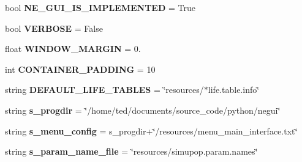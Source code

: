 \begin{DoxyCompactItemize}
\item 
bool {\bfseries N\+E\+\_\+\+G\+U\+I\+\_\+\+I\+S\+\_\+\+I\+M\+P\+L\+E\+M\+E\+N\+T\+ED} = True\hypertarget{namespacenegui_1_1pghostnotebook_a713e3c49323a10efdf84414a10af9f9e}{}\label{namespacenegui_1_1pghostnotebook_a713e3c49323a10efdf84414a10af9f9e}

\item 
bool {\bfseries V\+E\+R\+B\+O\+SE} = False\hypertarget{namespacenegui_1_1pghostnotebook_a047e31164346351c4093c0192244c081}{}\label{namespacenegui_1_1pghostnotebook_a047e31164346351c4093c0192244c081}

\item 
float {\bfseries W\+I\+N\+D\+O\+W\+\_\+\+M\+A\+R\+G\+IN} = 0.\hypertarget{namespacenegui_1_1pghostnotebook_a55d2191bb5b0ad01afd889f86f3a40cd}{}\label{namespacenegui_1_1pghostnotebook_a55d2191bb5b0ad01afd889f86f3a40cd}

\item 
int {\bfseries C\+O\+N\+T\+A\+I\+N\+E\+R\+\_\+\+P\+A\+D\+D\+I\+NG} = 10\hypertarget{namespacenegui_1_1pghostnotebook_a42838e920b3780dca9f1146ac8fc9e94}{}\label{namespacenegui_1_1pghostnotebook_a42838e920b3780dca9f1146ac8fc9e94}

\item 
string {\bfseries D\+E\+F\+A\+U\+L\+T\+\_\+\+L\+I\+F\+E\+\_\+\+T\+A\+B\+L\+ES} = \char`\"{}resources/$\ast$life.\+table.\+info\char`\"{}\hypertarget{namespacenegui_1_1pghostnotebook_a457461504a6b64ca6a744229aa15ea2f}{}\label{namespacenegui_1_1pghostnotebook_a457461504a6b64ca6a744229aa15ea2f}

\item 
string {\bfseries s\+\_\+progdir} = \char`\"{}/home/ted/documents/source\+\_\+code/python/negui\char`\"{}\hypertarget{namespacenegui_1_1pghostnotebook_aa6cd5fa1b19e89804b4e7029b7865fab}{}\label{namespacenegui_1_1pghostnotebook_aa6cd5fa1b19e89804b4e7029b7865fab}

\item 
string {\bfseries s\+\_\+menu\+\_\+config} = s\+\_\+progdir+\char`\"{}/resources/menu\+\_\+main\+\_\+interface.\+txt\char`\"{}\hypertarget{namespacenegui_1_1pghostnotebook_a847977d3fdbc31ec5347dba41127fda2}{}\label{namespacenegui_1_1pghostnotebook_a847977d3fdbc31ec5347dba41127fda2}

\item 
string {\bfseries s\+\_\+param\+\_\+name\+\_\+file} = \char`\"{}resources/simupop.\+param.\+names\char`\"{}\hypertarget{namespacenegui_1_1pghostnotebook_ac50c371dc355daca2be8c0c69bd5a8a1}{}\label{namespacenegui_1_1pghostnotebook_ac50c371dc355daca2be8c0c69bd5a8a1}


\end{DoxyCompactItemize}
